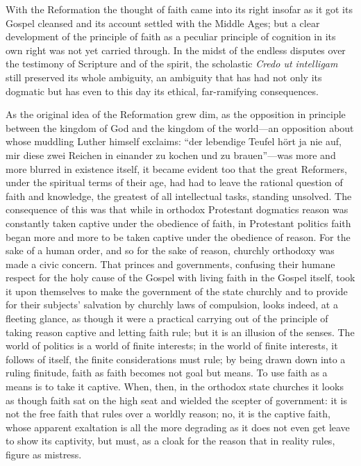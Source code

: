 \documentclass[12pt]{book}
\newcommand{\opage}[1]{\marginnote{\footnotesize\textit{[#1]}}}
\begin{document}
With the Reformation the thought of faith came into its right insofar as
it got its Gospel cleansed and its account settled with the Middle Ages;
but a clear development of the principle of faith as a peculiar
principle of cognition in its own right was not yet carried through. In
the midst of the endless disputes over the testimony of Scripture and of
the spirit, the scholastic \textit{Credo ut intelligam} still preserved
its whole ambiguity, an ambiguity that has had not only its dogmatic
but has even to this day its ethical, far-ramifying consequences.

As the original idea of the Reformation grew dim, as the opposition in
principle between the kingdom of God and the kingdom of the world---an
opposition about whose muddling Luther himself exclaims: ``der
lebendige Teufel hört ja nie auf, mir diese zwei Reichen in einander zu
kochen und zu brauen''---was more and more blurred in existence itself,
it became evident too that the great Reformers, under the spiritual
terms of their age, had had to leave the rational question of faith and
knowledge, the greatest of all intellectual tasks, standing unsolved.
The consequence of this was that while in orthodox Protestant dogmatics
reason was constantly taken captive under the obedience of faith, in
Protestant politics faith began more and more to be taken captive under
the obedience of reason. For the sake of a human order, and so for the
sake of reason, churchly orthodoxy was made a civic concern. That
princes and governments, confusing their humane respect for the holy
cause of the Gospel with living faith in the Gospel itself, took it upon
themselves to make the government of the state churchly and to provide
\opage{33}\setcounter{footnote}{0}%
for their subjects' salvation by churchly laws of compulsion, looks
indeed, at a fleeting glance, as though it were a practical carrying out
of the principle of taking reason captive and letting faith rule; but it
is an illusion of the senses. The world of politics is a world of
finite interests; in the world of finite interests, it follows of
itself, the finite considerations must rule; by being drawn down into a
ruling finitude, faith as faith becomes not goal but means. To use faith
as a means is to take it captive. When, then, in the orthodox state
churches it looks as though faith sat on the high seat and wielded the
scepter of government: it is not the free faith that rules over a
worldly reason; no, it is the captive faith, whose apparent exaltation
is all the more degrading as it does not even get leave to show its
captivity, but must, as a cloak for the reason that in reality rules,
figure as mistress.
\end{document}
